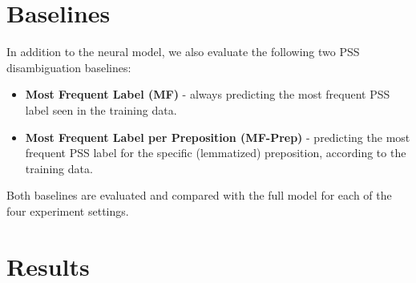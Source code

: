 \section{Baselines} \label{sec:pssbaselines}

In addition to the neural model, we also evaluate the following two PSS disambiguation baselines:

\begin{itemize}
    \item \textbf{Most Frequent Label (MF)} - always predicting the most frequent PSS label seen in the training data.
    \item \textbf{Most Frequent Label per Preposition (MF-Prep)} - predicting the most frequent PSS label for the specific (lemmatized) preposition, according to the training data.
\end{itemize}

Both baselines are evaluated and compared with the full model for each of the four experiment settings. 

\section{Results} \label{sec:pssresults}

